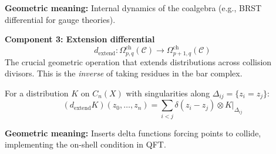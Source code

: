 \begin{theorem}
\textbf{Geometric meaning:} Internal dynamics of the coalgebra (e.g., BRST differential 
for gauge theories).

\textbf{Component 3: Extension differential}
$$d_{\text{extend}}: \Omega^{\text{ch}}_{p,q}(\mathcal{C}) \to 
\Omega^{\text{ch}}_{p+1,q}(\mathcal{C})$$
The crucial geometric operation that extends distributions across collision divisors. 
This is the \emph{inverse} of taking residues in the bar complex.

For a distribution $K$ on $C_n(X)$ with singularities along $\Delta_{ij} = 
\{z_i = z_j\}$:
$$(d_{\text{extend}}K)(z_0, \ldots, z_n) = \sum_{i < j} \delta(z_i - z_j) \otimes 
K|_{\Delta_{ij}}$$

\textbf{Geometric meaning:} Inserts delta functions forcing points to collide, 
implementing the on-shell condition in QFT.
\end{theorem}

